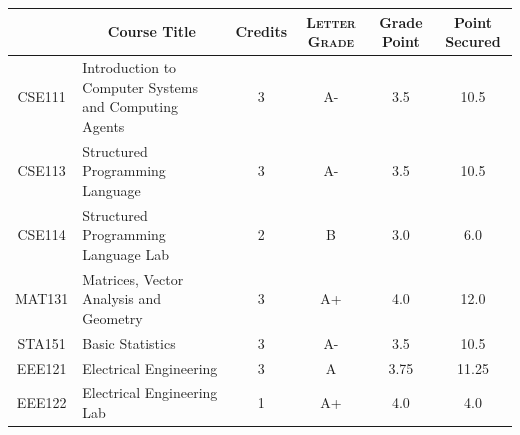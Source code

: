 \documentclass[11pt]{article}
\newcommand*{\numtwo}[1]{\pgfmathprintnumber[
                    fixed, precision=2, fixed zerofill=true]{#1}}
\begin{document}
                \begin{center}
                    \renewcommand{\arraystretch}{1.08}
                    
                \begin{tabular}{|c|l|c|>{\scshape}c|c|c|}
                \hline  \rule[-1ex]{0pt}{3.5ex} {\centering{\bf Course Code}} &  \multicolumn{1}{c|}{\textbf{Course Title}}  & {\bf Credits} & {\bf Letter Grade} & {\bf Grade Point} & {\bf Point Secured}  \\ 
                \hline   CSE111 &  Introduction to Computer Systems and Computing Agents		 & 3 & A- & 3.5 & 10.5 \\ %
                \hline   CSE113 &  Structured Programming Language		 & 3 & A- & 3.5 & 10.5 \\ %
                \hline   CSE114 &  Structured Programming Language Lab		 & 2 & B & 3.0 & 6.0 \\ %
                \hline   MAT131 &  Matrices, Vector Analysis and Geometry		 & 3 & A+ & 4.0 & 12.0 \\ %
                \hline   STA151 &  Basic Statistics		 & 3 & A- & 3.5 & 10.5 \\ %
                \hline   EEE121 &  Electrical Engineering		 & 3 & A & 3.75 & 11.25 \\ %
                \hline   EEE122 &  Electrical Engineering Lab		 & 1 & A+ & 4.0 & 4.0 \\ %

\hline                %
                \end{tabular}
                \end{center}
                \renewcommand{\arraystretch}{1.03}
\end{document}
